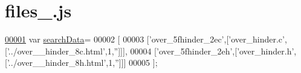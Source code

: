 \hypertarget{files__5_8js_source}{}\section{files\+\_.\+js}
\label{files__5_8js_source}

\begin{DoxyCode}
\hypertarget{files__5_8js_source.tex_l00001}{}\hyperlink{files__5_8js_ad01a7523f103d6242ef9b0451861231e}{00001} var \hyperlink{files__5_8js_ad01a7523f103d6242ef9b0451861231e}{searchData}=
00002 [
00003   [\textcolor{stringliteral}{'over\_5fhinder\_2ec'},[\textcolor{stringliteral}{'over\_hinder.c'},[\textcolor{stringliteral}{'../over\_\_hinder\_8c.html'},1,\textcolor{stringliteral}{''}]]],
00004   [\textcolor{stringliteral}{'over\_5fhinder\_2eh'},[\textcolor{stringliteral}{'over\_hinder.h'},[\textcolor{stringliteral}{'../over\_\_hinder\_8h.html'},1,\textcolor{stringliteral}{''}]]]
00005 ];
\end{DoxyCode}
